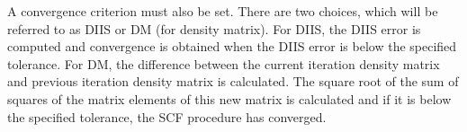 \documentclass[final,3p,times,twocolumn]{elsarticle}
\begin{document}
A convergence criterion must also be set. There are two choices, which will be referred to as DIIS or DM (for density matrix). For DIIS, the DIIS error is computed and convergence is obtained when the DIIS error is below the specified tolerance. For DM, the difference between the current iteration density matrix and previous iteration density matrix is calculated. The square root of the sum of squares of the matrix elements of this new matrix is calculated and if it is below the specified tolerance, the SCF procedure has converged.

% 
% 
% 
% 
% 
% 
% 
% 
% 
% 
% 
% 
% 
% 
% 
% 
%
%
\end{document}
